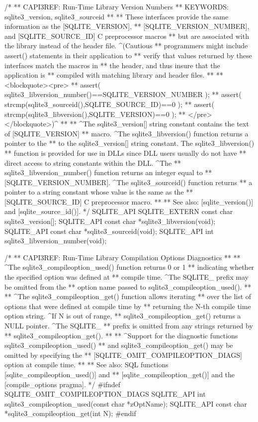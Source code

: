 \begin{Codex}[label=sqlite3.h,numbers=left]
{/*
** CAPI3REF: Run-Time Library Version Numbers
** KEYWORDS: sqlite3_version, sqlite3_sourceid
**
** These interfaces provide the same information as the [SQLITE_VERSION],
** [SQLITE_VERSION_NUMBER], and [SQLITE_SOURCE_ID] C preprocessor macros
** but are associated with the library instead of the header file.  ^(Cautious
** programmers might include assert() statements in their application to
** verify that values returned by these interfaces match the macros in
** the header, and thus insure that the application is
** compiled with matching library and header files.
**
** <blockquote><pre>
** assert( sqlite3_libversion_number()==SQLITE_VERSION_NUMBER );
** assert( strcmp(sqlite3_sourceid(),SQLITE_SOURCE_ID)==0 );
** assert( strcmp(sqlite3_libversion(),SQLITE_VERSION)==0 );
** </pre></blockquote>)^
**
** ^The sqlite3_version[] string constant contains the text of [SQLITE_VERSION]
** macro.  ^The sqlite3_libversion() function returns a pointer to the
** to the sqlite3_version[] string constant.  The sqlite3_libversion()
** function is provided for use in DLLs since DLL users usually do not have
** direct access to string constants within the DLL.  ^The
** sqlite3_libversion_number() function returns an integer equal to
** [SQLITE_VERSION_NUMBER].  ^The sqlite3_sourceid() function returns 
** a pointer to a string constant whose value is the same as the 
** [SQLITE_SOURCE_ID] C preprocessor macro.
**
** See also: [sqlite_version()] and [sqlite_source_id()].
*/
SQLITE_API SQLITE_EXTERN const char sqlite3_version[];
SQLITE_API const char *sqlite3_libversion(void);
SQLITE_API const char *sqlite3_sourceid(void);
SQLITE_API int sqlite3_libversion_number(void);

/*
** CAPI3REF: Run-Time Library Compilation Options Diagnostics
**
** ^The sqlite3_compileoption_used() function returns 0 or 1 
** indicating whether the specified option was defined at 
** compile time.  ^The SQLITE_ prefix may be omitted from the 
** option name passed to sqlite3_compileoption_used().  
**
** ^The sqlite3_compileoption_get() function allows iterating
** over the list of options that were defined at compile time by
** returning the N-th compile time option string.  ^If N is out of range,
** sqlite3_compileoption_get() returns a NULL pointer.  ^The SQLITE_ 
** prefix is omitted from any strings returned by 
** sqlite3_compileoption_get().
**
** ^Support for the diagnostic functions sqlite3_compileoption_used()
** and sqlite3_compileoption_get() may be omitted by specifying the 
** [SQLITE_OMIT_COMPILEOPTION_DIAGS] option at compile time.
**
** See also: SQL functions [sqlite_compileoption_used()] and
** [sqlite_compileoption_get()] and the [compile_options pragma].
*/
#ifndef SQLITE_OMIT_COMPILEOPTION_DIAGS
SQLITE_API int sqlite3_compileoption_used(const char *zOptName);
SQLITE_API const char *sqlite3_compileoption_get(int N);
#endif

}
\end{Codex}
